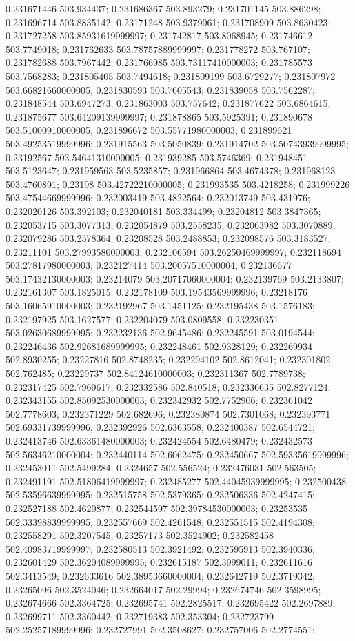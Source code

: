 0.231671446 503.934437; 0.231686367 503.893279; 0.231701145 503.886298; 0.231696714 503.8835142; 0.23171248 503.9379061; 0.231708909 503.8630423; 0.231727258 503.85931619999997; 0.231742817 503.8068945; 0.231746612 503.7749018; 0.231762633 503.78757889999997; 0.231778272 503.767107; 0.231782688 503.7967442; 0.231766985 503.73117410000003; 0.231785573 503.7568283; 0.231805405 503.7494618; 0.231809199 503.6729277; 0.231807972 503.66821660000005; 0.231830593 503.7605543; 0.231839058 503.7562287; 0.231848544 503.6947273; 0.231863003 503.757642; 0.231877622 503.6864615; 0.231875677 503.64209139999997; 0.231878865 503.5925391; 0.231890678 503.51000910000005; 0.231896672 503.55771980000003; 0.231899621 503.49253519999996; 0.231915563 503.5050839; 0.231914702 503.50743939999995; 0.23192567 503.54641310000005; 0.231939285 503.5746369; 0.231948451 503.5123647; 0.231959563 503.5235857; 0.231966864 503.4674378; 0.231968123 503.4760891; 0.23198 503.42722210000005; 0.231993535 503.4218258; 0.231999226 503.47544669999996; 0.232003419 503.4822564; 0.232013749 503.431976; 0.232020126 503.392103; 0.232040181 503.334499; 0.23204812 503.3847365; 0.232053715 503.3077313; 0.232054879 503.2558235; 0.232063982 503.3070889; 0.232079286 503.2578364; 0.23208528 503.2488853; 0.232098576 503.3183527; 0.23211101 503.27993580000003; 0.232106594 503.26250469999997; 0.232118694 503.27817980000003; 0.232127414 503.20057510000004; 0.232136677 503.17432130000003; 0.23214079 503.20717060000004; 0.232139769 503.2133807; 0.232161307 503.1825015; 0.232178109 503.19543569999996; 0.23218176 503.16065910000003; 0.232192967 503.1451125; 0.232195438 503.1576183; 0.232197925 503.1627577; 0.232204079 503.0809558; 0.232230351 503.02630689999995; 0.232232136 502.9645486; 0.232245591 503.0194544; 0.232246436 502.92681689999995; 0.232248461 502.9328129; 0.232269934 502.8930255; 0.23227816 502.8748235; 0.232294102 502.8612041; 0.232301802 502.762485; 0.23229737 502.84124610000003; 0.232311367 502.7789738; 0.232317425 502.7969617; 0.232332586 502.840518; 0.232336635 502.8277124; 0.232343155 502.85092530000003; 0.232342932 502.7752906; 0.232361042 502.7778603; 0.232371229 502.682696; 0.232380874 502.7301068; 0.232393771 502.69331739999996; 0.232392926 502.6363558; 0.232400387 502.6544721; 0.232413746 502.63361480000003; 0.232424554 502.6480479; 0.232432573 502.56346210000004; 0.232440114 502.6062475; 0.232450667 502.59335619999996; 0.232453011 502.5499284; 0.2324657 502.556524; 0.232476031 502.563505; 0.232491191 502.51806419999997; 0.232485277 502.44045939999995; 0.232500438 502.53596639999995; 0.232515758 502.5379365; 0.232506336 502.4247415; 0.232527188 502.4620877; 0.232544597 502.39784530000003; 0.23253535 502.33398839999995; 0.232557669 502.4261548; 0.232551515 502.4194308; 0.232558291 502.3207545; 0.23257173 502.3524902; 0.232582458 502.40983719999997; 0.232580513 502.3921492; 0.232595913 502.3940336; 0.232601429 502.36204089999995; 0.232615187 502.3999011; 0.232611616 502.3413549; 0.232633616 502.38953660000004; 0.232642719 502.3719342; 0.23265096 502.3524046; 0.232664017 502.29994; 0.232674746 502.3598995; 0.232674666 502.3364725; 0.232695741 502.2825517; 0.232695422 502.2697889; 0.232699711 502.3360442; 0.232719383 502.353304; 0.232723799 502.25257189999996; 0.232727991 502.3508627; 0.232757006 502.2774551; 